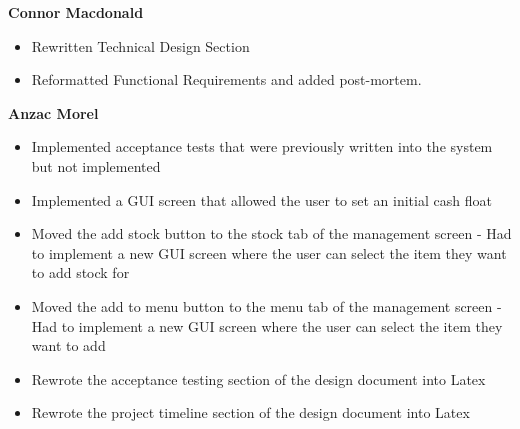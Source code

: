 
\textbf{Connor Macdonald}
\begin{itemize}
	\item Rewritten Technical Design Section
	\item Reformatted Functional Requirements and added post-mortem.
\end{itemize}

\noindent\textbf{Anzac Morel}
\begin{itemize}
	\item Implemented acceptance tests that were previously written into the system but not implemented
	\item Implemented a GUI screen that allowed the user to set an initial cash float
	\item Moved the add stock button to the stock tab of the management screen - Had to implement a new GUI screen where the user can select the item they want to add stock for
	\item Moved the add to menu button to the menu tab of the management screen - Had to implement a new GUI screen where the user can select the item they want to add
	\item Rewrote the acceptance testing section of the design document into Latex
	\item Rewrote the project timeline section of the design document into Latex
\end{itemize}